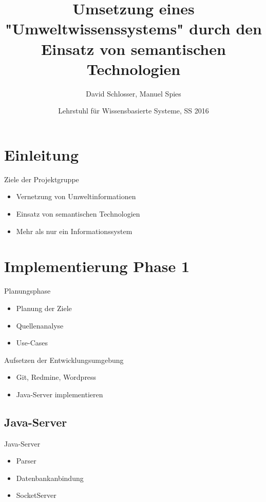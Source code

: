 \documentclass[aspectratio=169]{beamer}
\title[Umwelt PG]{%
  Umsetzung eines "Umweltwissenssystems" durch den Einsatz von semantischen Technologien}
\subtitle{}
\author[David Schlosser, Manuel Spies]{%
  David Schlosser, Manuel Spies}
\date[Lehrstuhl für Wissensbasierte Systeme, SS 2016]{Lehrstuhl für Wissensbasierte Systeme, SS 2016}
\begin{document}
\begin{frame}
  \maketitle
\end{frame}

\section{Einleitung}

\begin{frame}{Ziele der Projektgruppe}
  \begin{itemize}
  	\item Vernetzung von Umweltinformationen
    \item Einsatz von semantischen Technologien
    \item Mehr als nur ein Informationssystem
  \end{itemize}
\end{frame}

\section{Implementierung Phase 1}

\begin{frame}{Planungsphase}
  \begin{itemize}
    \item Planung der Ziele
    \item Quellenanalyse
    \item Use-Cases
  \end{itemize}
\end{frame}

\begin{frame}{Aufsetzen der Entwicklungsumgebung}
  \begin{itemize}
  	\item Git, Redmine, Wordpress
  	\item Java-Server implementieren
  \end{itemize}
\end{frame}

\subsection{Java-Server}
\begin{frame}{Java-Server}
  \begin{itemize}
    \item Parser
    \item Datenbankanbindung
    \item SocketServer
  \end{itemize}
\end{frame}
\end{document}
